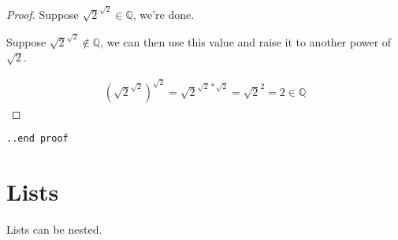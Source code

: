 \documentclass[12pt]{article}
\begin{document}
\begin{flushleft}
\begin{proof}
Suppose $\sqrt{2}^{\sqrt{2}} \in \mathbb{Q}$, we're done.

Suppose $\sqrt{2}^{\sqrt{2}} \notin \mathbb{Q}$, we can then use this value and raise it to another power of $\sqrt{2}$.

\begin{gather*}
(\sqrt{2}^{\sqrt{2}})^{\sqrt{2}} = \sqrt{2}^{\sqrt{2} * \sqrt{2}} = \sqrt{2}^2 = 2 \in \mathbb{Q} 
\end{gather*}
\end{proof}
\verb|..end proof|

\newpage

\section*{Lists}

Lists can be nested.


\end{flushleft}
\end{document}
